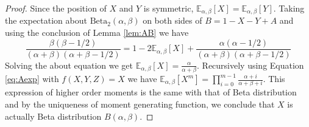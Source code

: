 \documentclass[twoside]{article}%
\def\E{\mathbb{E}}
\def\Beta{\textrm{Beta}}
\begin{document}
\begin{proof}
Since the position of $X$ and $Y$ is symmetric,
$\E_{\alpha, \beta}[X]=\E_{\alpha, \beta}[Y]$.
Taking the expectation about $\Beta_2(\alpha, \beta)$
on both sides of $B=1-X-Y+A$ and using the
conclusion of Lemma \ref{lem:AB} we have
\begin{equation*}
\frac{\beta(\beta-1/2)}{(\alpha+\beta)(\alpha+\beta-1/2)}
= 1 - 2\E_{\alpha, \beta}[X] +
\frac{\alpha(\alpha-1/2)}{(\alpha+\beta)(\alpha+\beta-1/2)}
\end{equation*}
Solving the about equation we get
$\E_{\alpha, \beta}[X]=\frac{\alpha}{\alpha + \beta}$.
Recursively using Equation \eqref{eq:Aexp} with $f(X,Y,Z)=X$
we have $\E_{\alpha, \beta}[X^m] =
\prod_{i=0}^{m-1}\frac{\alpha+i}{\alpha+\beta+i}$.
This expression of higher order moments
is the same with that of Beta distribution and by
the uniqueness of moment generating function, we
conclude that $X$ is actually Beta distribution $B(\alpha,
\beta)$.
\end{proof}
\end{document}
